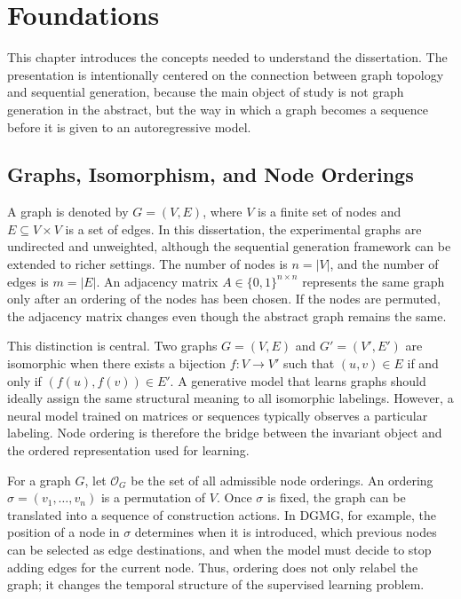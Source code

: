 \chapter{Foundations}
\label{chap:foundations}

This chapter introduces the concepts needed to understand the dissertation. The presentation is intentionally centered on the connection between graph topology and sequential generation, because the main object of study is not graph generation in the abstract, but the way in which a graph becomes a sequence before it is given to an autoregressive model.

\section{Graphs, Isomorphism, and Node Orderings}
\label{sec:graphs-orderings}

A graph is denoted by $G=(V,E)$, where $V$ is a finite set of nodes and $E\subseteq V\times V$ is a set of edges. In this dissertation, the experimental graphs are undirected and unweighted, although the sequential generation framework can be extended to richer settings. The number of nodes is $n=|V|$, and the number of edges is $m=|E|$. An adjacency matrix $A\in\{0,1\}^{n\times n}$ represents the same graph only after an ordering of the nodes has been chosen. If the nodes are permuted, the adjacency matrix changes even though the abstract graph remains the same.

This distinction is central. Two graphs $G=(V,E)$ and $G'=(V',E')$ are isomorphic when there exists a bijection $f:V\rightarrow V'$ such that $(u,v)\in E$ if and only if $(f(u),f(v))\in E'$. A generative model that learns graphs should ideally assign the same structural meaning to all isomorphic labelings. However, a neural model trained on matrices or sequences typically observes a particular labeling. Node ordering is therefore the bridge between the invariant object and the ordered representation used for learning.

For a graph $G$, let $\mathcal{O}_G$ be the set of all admissible node orderings. An ordering $\sigma=(v_1,\ldots,v_n)$ is a permutation of $V$. Once $\sigma$ is fixed, the graph can be translated into a sequence of construction actions. In DGMG, for example, the position of a node in $\sigma$ determines when it is introduced, which previous nodes can be selected as edge destinations, and when the model must decide to stop adding edges for the current node. Thus, ordering does not only relabel the graph; it changes the temporal structure of the supervised learning problem.

